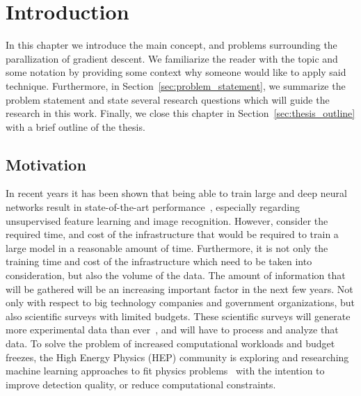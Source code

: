 %
%
%

\chapter{Introduction}
\label{chapter:introduction}

In this chapter we introduce the main concept, and problems surrounding the parallization of gradient descent. We familiarize the reader with the topic and some notation by providing some context why someone would like to apply said technique. Furthermore, in Section~\ref{sec:problem_statement}, we summarize the problem statement and state several research questions which will guide the research in this work. Finally, we close this chapter in Section~\ref{sec:thesis_outline} with a brief outline of the thesis.

\section{Motivation}
\label{sec:motivation}

In recent years it has been shown that being able to train large and deep neural networks result in state-of-the-art performance~\cite{wu2016google, dean2012large}, especially regarding unsupervised feature learning and image recognition. However, consider the required time, and cost of the infrastructure that would be required to train a large model in a reasonable amount of time. Furthermore, it is not only the training time and cost of the infrastructure which need to be taken into consideration, but also the volume of the data. The amount of information that will be gathered will be an increasing important factor in the next few years. Not only with respect to big technology companies and government organizations, but also scientific surveys with limited budgets. These scientific surveys will generate more experimental data than ever~\cite{hllhcdesignreport, ivezic2008lsst}, and will have to process and analyze that data. To solve the problem of increased computational workloads and budget freezes, the High Energy Physics (HEP) community is exploring and researching machine learning approaches to fit physics problems~\cite{bian2016recent, de2017learning, louppe2016learning} with the intention to improve detection quality, or reduce computational constraints.\\

